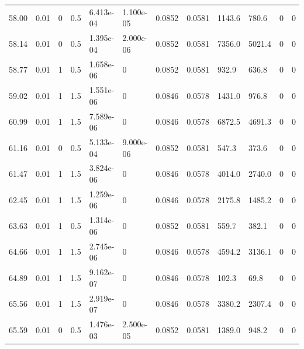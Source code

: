 \documentclass[preview]{standalone}
\begin{document}
{{{\begin{tabular}{L{1.2cm}C{1.2cm} C{0.3cm}C{0.5cm} C{1.4cm}C{1.4cm} C{1.4cm}C{1.4cm} C{1.6cm}C{1.6cm} C{1.6cm}C{1.6cm}}
  58.00  &  0.01  & 0     & 0.5 &  6.413e-04  & 1.100e-05  &  0.0852&   0.0581& 1143.6 & 780.6   &  0 & 0  \\ 
  58.14  &  0.01  & 0     & 0.5 &  1.395e-04  & 2.000e-06  &  0.0852&   0.0581& 7356.0 & 5021.4   &  0 & 0  \\ 
  58.77  &  0.01  & 1     & 0.5 &  1.658e-06  & 0  &  0.0852&   0.0581& 932.9 & 636.8   &  0 & 0  \\ 
  59.02  &  0.01  & 1     & 1.5 &  1.551e-06  & 0  &  0.0846&   0.0578& 1431.0 & 976.8   &  0 & 0  \\ 
  60.99  &  0.01  & 1     & 1.5 &  7.589e-06  & 0  &  0.0846&   0.0578& 6872.5 & 4691.3   &  0 & 0  \\ 
  61.16  &  0.01  & 0     & 0.5 &  5.133e-04  & 9.000e-06  &  0.0852&   0.0581& 547.3 & 373.6   &  0 & 0  \\ 
  61.47  &  0.01  & 1     & 1.5 &  3.824e-06  & 0  &  0.0846&   0.0578& 4014.0 & 2740.0   &  0 & 0  \\ 
  62.45  &  0.01  & 1     & 1.5 &  1.259e-06  & 0  &  0.0846&   0.0578& 2175.8 & 1485.2   &  0 & 0  \\ 
  63.63  &  0.01  & 1     & 0.5 &  1.314e-06  & 0  &  0.0852&   0.0581& 559.7 & 382.1   &  0 & 0  \\ 
  64.66  &  0.01  & 1     & 1.5 &  2.745e-06  & 0  &  0.0846&   0.0578& 4594.2 & 3136.1   &  0 & 0  \\ 
  64.89  &  0.01  & 1     & 1.5 &  9.162e-07  & 0  &  0.0846&   0.0578& 102.3 & 69.8   &  0 & 0  \\ 
  65.56  &  0.01  & 1     & 1.5 &  2.919e-07  & 0  &  0.0846&   0.0578& 3380.2 & 2307.4   &  0 & 0  \\ 
  65.59  &  0.01  & 0     & 0.5 &  1.476e-03  & 2.500e-05  &  0.0852&   0.0581& 1389.0 & 948.2   &  0 & 0  \\ 
\hline 
\end{tabular} 

}}}
\end{document}
